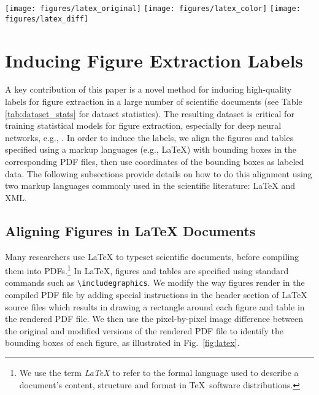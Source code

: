\documentclass[sigconf]{acmart}
\begin{document}
\begin{figure*}
\texttt{[image: figures/latex\_original]}
\texttt{[image: figures/latex\_color]}
\texttt{[image: figures/latex\_diff]}
\caption{Modifying LaTeX source to recover figure positions. Figure bounding boxes are shown in red, figure names in green, and captions in blue. Left: original document. Middle: document compiled from modified source. Right: image difference between original and modified documents.}
\label{fig:latex}
\end{figure*}\section{Inducing Figure Extraction Labels}\label{data}A key contribution of this paper is a novel method for inducing high-quality labels for figure extraction in a large number of scientific documents (see Table \ref{tab:dataset_stats} for dataset statistics).
The resulting dataset is critical for training statistical models for figure extraction, especially  for deep neural networks, e.g., \cite{resnet}.
In order to induce the labels, we align the figures and tables specified using a markup languages (e.g., LaTeX) with bounding boxes in the corresponding PDF files, then use coordinates of the bounding boxes as labeled data.
The following subsections provide details on how to do this alignment using two markup languages commonly used in the scientific literature: LaTeX and XML.

\subsection{Aligning Figures in LaTeX Documents}\label{sec:align_latex}
Many researchers use LaTeX to typeset scientific documents, before compiling them into PDFs.\footnote{We use the term \emph{LaTeX} to refer to the formal language used to describe a document's content, structure and format in \TeX~software distributions.}
In LaTeX, figures and tables are specified using standard commands such as \verb|\includegraphics|.
We modify the way figures render in the compiled PDF file by adding special instructions in the header section of LaTeX source files which results in drawing a rectangle around each figure and table in the rendered PDF file. 
We then use the pixel-by-pixel image difference between the original and modified versions of the rendered PDF file to identify the bounding boxes of each figure, as illustrated in Fig.~\ref{fig:latex}.
\end{document}
